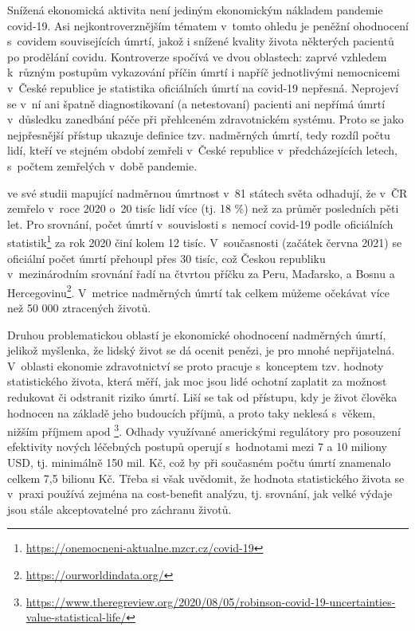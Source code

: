 Snížená ekonomická aktivita není jediným ekonomickým nákladem pandemie covid-19. Asi nejkontroverznějším tématem v~tomto ohledu je peněžní ohodnocení s~covidem souvisejících úmrtí, jakož i snížené kvality života některých pacientů po pro\-dě\-lá\-ní covidu. Kontroverze spočívá ve dvou oblastech: zaprvé vzhledem k~různým postupům vykazování příčin úmrtí i napříč jednotlivými nemocnicemi v~České republice je statistika oficiálních úmrtí na covid-19 nepřesná. Neprojeví se v~ní ani špatně diagnostikovaní (a netestovaní) pacienti ani nepřímá úmrtí v~důsledku zanedbání péče při přehlceném zdravotnickém systému. Proto se jako nejpřesnější přístup ukazuje definice tzv. nadměrných úmrtí, tedy rozdíl počtu lidí, kteří ve stejném období zemřeli v~České republice v~předcházejících letech, s~počtem zemřelých v~době pandemie. 

\cite{karlinsky2021tracking} ve své studii mapující nadměrnou úmrtnost v~81 státech světa odhadují, že v~ČR zemřelo v~roce 2020 o~20 tisíc lidí více (tj. 18 \%) než za průměr posledních pěti let. Pro srovnání, počet úmrtí v~souvislosti s~nemocí covid-19 podle oficiálních statistik\footnote{\url{https://onemocneni-aktualne.mzcr.cz/covid-19}} za rok 2020 činí kolem 12 tisíc. V~současnosti (začátek června 2021) se oficiální počet úmrtí přehoupl přes 30 tisíc, což Českou republiku v~mezinárodním srovnání řadí na čtvrtou příčku za Peru, Maďarsko, a Bosnu a Hercegovinu\footnote{\url{https://ourworldindata.org/}}. V~metrice nadměrných úmrtí tak celkem můžeme očekávat více než 50 000 ztracených životů.

Druhou problematickou oblastí je ekonomické ohodnocení nadměrných úmrtí, jelikož myšlenka, že lidský život se dá ocenit penězi, je pro mnohé nepřijatelná. V~oblasti ekonomie zdravotnictví se proto pracuje s~konceptem tzv. hodnoty statistického života, která měří, jak moc jsou lidé ochotní zaplatit za možnost redukovat či odstranit riziko úmrtí. Liší se tak od přístupu, kdy je život člověka hodnocen na základě jeho budoucích příjmů, a proto taky neklesá s~věkem, nižším příjmem apod \footnote{\url{https://www.theregreview.org/2020/08/05/robinson-covid-19-uncertainties-value-statistical-life/}}. Odhady využívané americkými regulátory pro posouzení efektivity nových léčebných postupů operují s~hodnotami mezi 7 a 10 miliony USD, tj. minimálně 150 mil. Kč, což by při současném počtu úmrtí znamenalo celkem 7,5 bilionu Kč. Třeba si však uvědomit, že hodnota statistického života se v~praxi používá zejména na cost-benefit analýzu, tj. srovnání, jak velké výdaje jsou stále akceptovatelné pro záchranu životů.

